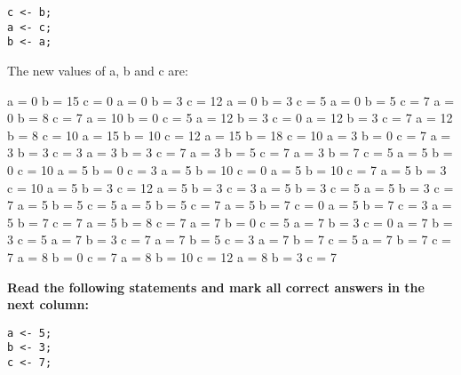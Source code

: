 \documentclass[10pt]{exam}
\begin{document}
\begin{questions}
\begin{minipage}[t][][t]{0.18\textwidth}
\begin{lstlisting}
c <- b;
a <- c;
b <- a;
  \end{lstlisting}
\end{minipage}
  \hfill
\begin{minipage}[t][][t]{0.75\textwidth}
  The new values of a, b and c are:
  \begin{multicols*}{3}
\begin{checkboxes}
    \choice a = 0 b = 15 c = 0
    \choice a = 0 b = 3 c = 12
    \choice a = 0 b = 3 c = 5
    \choice a = 0 b = 5 c = 7
    \choice a = 0 b = 8 c = 7
    \choice a = 10 b = 0 c = 5
    \choice a = 12 b = 3 c = 0
    \choice a = 12 b = 3 c = 7
    \choice a = 12 b = 8 c = 10
    \choice a = 15 b = 10 c = 12
    \choice a = 15 b = 18 c = 10
    \choice a = 3 b = 0 c = 7
    \choice a = 3 b = 3 c = 3
    \choice a = 3 b = 3 c = 7
    \choice a = 3 b = 5 c = 7
    \choice a = 3 b = 7 c = 5
    \choice a = 5 b = 0 c = 10
    \choice a = 5 b = 0 c = 3
    \choice a = 5 b = 10 c = 0
    \choice a = 5 b = 10 c = 7
    \choice a = 5 b = 3 c = 10
    \choice a = 5 b = 3 c = 12
    \choice a = 5 b = 3 c = 3
    \choice a = 5 b = 3 c = 5
    \choice a = 5 b = 3 c = 7
    \choice a = 5 b = 5 c = 5
    \choice a = 5 b = 5 c = 7
    \choice a = 5 b = 7 c = 0
    \choice a = 5 b = 7 c = 3
    \choice a = 5 b = 7 c = 7
    \choice a = 5 b = 8 c = 7
    \choice a = 7 b = 0 c = 5
    \choice a = 7 b = 3 c = 0
    \choice a = 7 b = 3 c = 5
    \choice a = 7 b = 3 c = 7
    \choice a = 7 b = 5 c = 3
    \choice a = 7 b = 7 c = 5
    \choice a = 7 b = 7 c = 7
    \choice a = 8 b = 0 c = 7
    \choice a = 8 b = 10 c = 12
    \choice a = 8 b = 3 c = 7
  \end{checkboxes}
\end{multicols*}
\end{minipage}

\vspace{1cm}  \begin{minipage}[t][][t]{0.18\textwidth}
\question \bf Read the following statements and mark all correct answers in the next column: \raggedright
  \begin{lstlisting}
a <- 5;
b <- 3;
c <- 7;


\end{lstlisting}
\end{minipage}
\end{questions}
\end{document}
